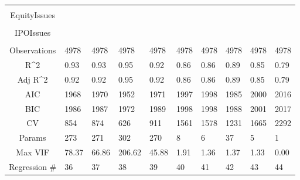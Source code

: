 \documentclass{article}
\begin{document}
\begin{table}[H]
\begin{tabular}{|clllllllll|}
   &  &  &  &  &  &  &  &  &  \\ 
  EquityIssues &  &  &  &  &  &  &  &  &  \\ 
   &  &  &  &  &  &  &  &  &  \\ 
  IPOIssues &  &  &  &  &  &  &  &  &  \\ 
   &  &  &  &  &  &  &  &  &  \\ 
  \hline 
 Observations & 4978 & 4978 & 4978 & 4978 & 4978 & 4978 & 4978 & 4978 & 4978 \\ 
  R^2 & 0.93 & 0.93 & 0.95 & 0.92 & 0.86 & 0.86 & 0.89 & 0.85 & 0.79 \\ 
  Adj R^2 & 0.92 & 0.92 & 0.95 & 0.92 & 0.86 & 0.86 & 0.89 & 0.85 & 0.79 \\ 
  AIC & 1968 & 1970 & 1952 & 1971 & 1997 & 1998 & 1985 & 2000 & 2016 \\ 
  BIC & 1986 & 1987 & 1972 & 1989 & 1998 & 1998 & 1988 & 2001 & 2017 \\ 
  CV & 854 & 874 & 626 & 911 & 1561 & 1578 & 1231 & 1665 & 2292 \\ 
  Params & 273 & 271 & 302 & 270 & 8 & 6 & 37 & 5 & 1 \\ 
  Max VIF & 78.37 & 66.86 & 206.62 & 45.88 & 1.91 & 1.36 & 1.37 & 1.33 & 0.00 \\ 
  Regression \# & 36 & 37 & 38 & 39 & 40 & 41 & 42 & 43 & 44 \\ 
   \hline
\end{tabular}
 
\end{table}
\end{document}
